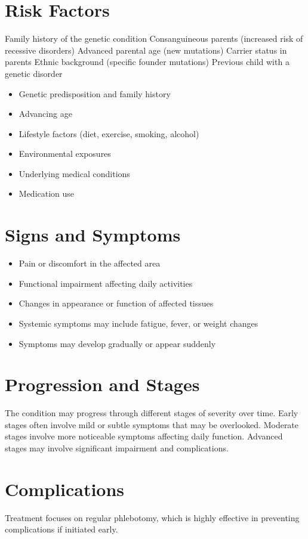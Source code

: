 \section{Risk Factors}
Family history of the genetic condition Consanguineous parents (increased risk of recessive disorders) Advanced parental age (new mutations) Carrier status in parents Ethnic background (specific founder mutations) Previous child with a genetic disorder

\begin{itemize}[noitemsep]
  \item Genetic predisposition and family history
  \item Advancing age
  \item Lifestyle factors (diet, exercise, smoking, alcohol)
  \item Environmental exposures
  \item Underlying medical conditions
  \item Medication use
\end{itemize}
\section{Signs and Symptoms}
\begin{itemize}[noitemsep]
  \item Pain or discomfort in the affected area
  \item Functional impairment affecting daily activities
  \item Changes in appearance or function of affected tissues
  \item Systemic symptoms may include fatigue, fever, or weight changes
  \item Symptoms may develop gradually or appear suddenly
\end{itemize}
\section{Progression and Stages}
The condition may progress through different stages of severity over time. Early stages often involve mild or subtle symptoms that may be overlooked. Moderate stages involve more noticeable symptoms affecting daily function. Advanced stages may involve significant impairment and complications.
\section{Complications}
Treatment focuses on regular phlebotomy, which is highly effective in preventing complications if initiated early.

